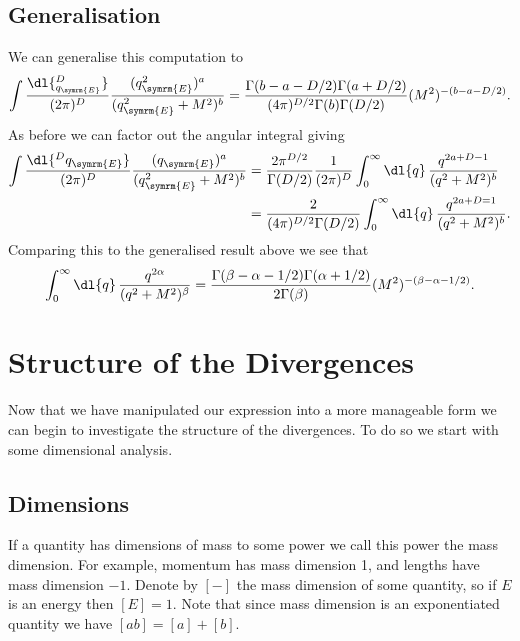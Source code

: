 \documentclass[fleqn]{NotesClass}
\begin{document}
    \section{Generalisation}
    We can generalise this computation to
    \begin{equation}\label{eqn:generalised expression}
        \int \frac{\dl{^D_{q_{\symrm{E}}}}}{(2\pi)^D} \frac{(q_{\symrm{E}}^2)^a}{(q_{\symrm{E}}^2 + M^2)^b} = \frac{\Gamma(b - a - D/2) \Gamma(a + D/2)}{(4\pi)^{D/2}\Gamma(b)\Gamma(D/2)} (M^2)^{-(b - a - D/2)}.
    \end{equation}
    As before we can factor out the angular integral giving
    \begin{align}
        \int \frac{\dl{^Dq_{\symrm{E}}}}{(2\pi)^D} \frac{(q_{\symrm{E}})^a}{(q_{\symrm{E}}^2 + M^2)^b} &= \frac{2\pi^{D/2}}{\Gamma(D/2)} \frac{1}{(2\pi)^D} \int_0^\infty \dl{q} \, \frac{q^{2a + D - 1}}{(q^2 + M^2)^b}\\
        &= \frac{2}{(4\pi)^{D/2}\Gamma(D/2)} \int_0^\infty \dl{q} \, \frac{q^{2a + D = 1}}{(q^2 + M^2)^b}.
    \end{align}
    Comparing this to the generalised result above we see that
    \begin{equation}
        \int_0^\infty \dl{q} \, \frac{q^{2\alpha}}{(q^2 + M^2)^\beta} = \frac{\Gamma(\beta - \alpha - 1/2)\Gamma(\alpha + 1/2)}{2\Gamma(\beta)} (M^2)^{-(\beta - \alpha - 1/2)}.
    \end{equation}
    
    \chapter{Structure of the Divergences}
    Now that we have manipulated our expression into a more manageable form we can begin to investigate the structure of the divergences.
    To do so we start with some dimensional analysis.
    
    \section{Dimensions}
    If a quantity has dimensions of mass to some power we call this power the mass dimension.
    For example, momentum has mass dimension 1, and lengths have mass dimension \(-1\).
    Denote by \([-]\) the mass dimension of some quantity, so if \(E\) is an energy then \([E] = 1\).
    Note that since mass dimension is an exponentiated quantity we have \([ab] = [a] + [b]\).
    
\end{document}
